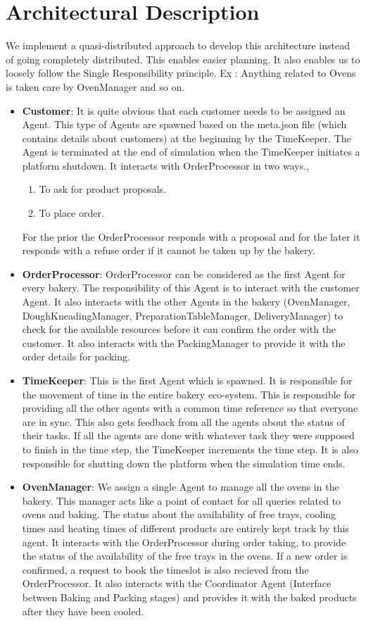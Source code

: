 \documentclass[12pt]{article}
\begin{document}
\section{Architectural Description}%
\label{sec:description}
We implement a quasi-distributed approach to develop this architecture instead of going completely distributed. This enables easier planning. It also enables us to loosely follow the Single Responsibility principle. Ex : Anything related to Ovens is taken care by OvenManager and so on.
\begin{itemize}
    \item \textbf{Customer}: It is quite obvious that each customer needs to be assigned an Agent. This type of Agents are spawned based on the meta.json file (which contains details about customers) at the beginning by the TimeKeeper. The Agent is terminated at the end of simulation when the TimeKeeper initiates a platform shutdown. It interacts with OrderProcessor in two ways.,
    \begin{enumerate}
    	\item To ask for product proposals.
    	\item To place order. 
    \end{enumerate}
    For the prior the OrderProcessor responds with a proposal and for the later it responds with a refuse order if it cannot be taken up by the bakery.
    \item \textbf{OrderProcessor}: OrderProcessor can be considered as the first Agent for every bakery. The responsibility of this Agent is to interact with the customer Agent. It also interacts with the other Agents in the bakery (OvenManager, DoughKneadingManager, PreparationTableManager, DeliveryManager) to check for the available resources before it can confirm the order with the customer. It also interacts with the PackingManager to provide it with the order details for packing.
    \item \textbf{TimeKeeper}: This is the first Agent which is spawned. It is responsible for the movement of time in the entire bakery eco-system. This is responsible for providing all the other agents with a common time reference so that everyone are in sync. This also gets feedback from all the agents about the status of their tasks. If all the agents are done with whatever task they were supposed to finish in the time step, the TimeKeeper increments the time step. It is also responsible for shutting down the platform when the simulation time ends.
    \item \textbf{OvenManager}: We assign a single Agent to manage all the ovens in the bakery. This manager acts like a point of contact for all queries related to ovens and baking. The status about the availability of free trays, cooling times and heating times of different products are entirely kept track by this agent. It interacts with the OrderProcessor during order taking, to provide the status of the availability of the free trays in the ovens. If a new order is confirmed, a request to book the timeslot is also recieved from the OrderProcessor. It also interacts with the Coordinator Agent (Interface between Baking and Packing stages) and provides it with the baked products after they have been cooled.

\end{itemize}
\end{document}
